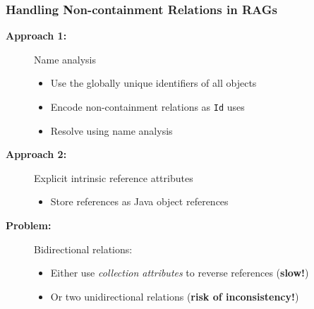 \documentclass[aspectratio=169,9pt,english]{beamer}
\begin{document}
\begin{frame}
	\frametitle{Handling Non-containment Relations in RAGs}
	\begin{description}
		\item[\textbf{Approach 1:}] Name analysis
		\begin{itemize}
			\item Use the globally unique identifiers of all objects
			\item Encode non-containment relations as \texttt{Id} uses
			\item Resolve using name analysis
		\end{itemize}
		\item[\textbf{Approach 2:}] Explicit intrinsic reference attributes
		\begin{itemize}
			\item Store references as Java object references
		\end{itemize}
	\end{description}
	
	\begin{description}
		\item[\textbf{Problem:}] Bidirectional relations:
		\begin{itemize}
			\item Either use \emph{collection attributes} to reverse references \textcolor{HKS07}{(\textbf{slow!})}
			\item Or two unidirectional relations \textcolor{HKS07}{(\textbf{risk of inconsistency!})}
		\end{itemize}
	\end{description}
\end{frame}
\end{document}
